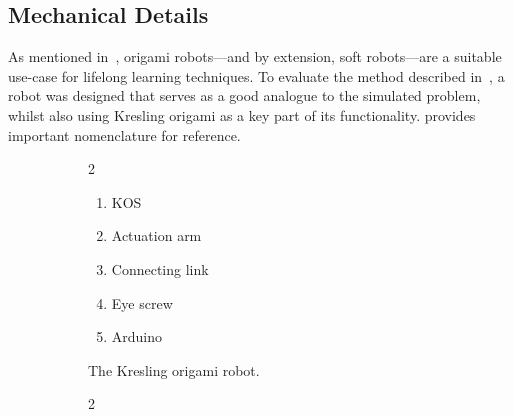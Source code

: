 \subsection{Mechanical Details}\label{subsec:mechanical-details}
As mentioned in~, origami robots—and by extension, soft robots—are a suitable use-case for lifelong learning techniques.
To evaluate the method described in~, a robot was designed that serves as a good analogue to the simulated problem, whilst also using Kresling origami as a key part of its functionality.
 provides important nomenclature for reference.

\begin{figure}
    \centering
    \begin{subfigure}[t]{\linewidth}
        \centering
        \def\svgwidth{0.9\linewidth}
        \scriptsize\selectfont
        \begin{multicols}{2}
            \small
            \begin{enumerate}
                \item KOS               \label{item:kos}
                \item Actuation arm     \label{item:arm}
                \item Connecting link   \label{item:link}
                \item Eye screw         \label{item:eye}
                \item Arduino           \label{item:arduino}
                \setcounter{annotations}{\value{enumi}}
            \end{enumerate}
        \end{multicols}
        \vspace*{-1em}
        \caption{The Kresling origami robot.}
        \label{fig:nomen-robot}
        \vspace*{1em}
    \end{subfigure}
    \begin{subfigure}[b]{\linewidth}
        \centering
        \def\svgwidth{0.9\linewidth}
        \scriptsize\selectfont
        \begin{multicols}{2}
            \small

\end{multicols}
\end{subfigure}
\end{figure}
